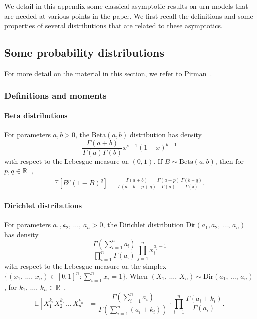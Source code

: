 \documentclass[10pt]{amsart}
\theoremstyle{definition}\newtheorem{defi}[theo]{Definition}\newtheorem{rema}[theo]{Remark}\newtheorem{exam}[theo]{Example}\newtheorem{exem}[theo]{Example}\newtheorem{nota}[theo]{Notation}
\newcommand{\Ec}[1]{\mathbb{E} \left[#1\right]}
\newcommand{\Betal}{\mathrm{Beta}}
\newcommand{\Dir}{\mathrm{Dir}}
\newcommand{\R}{\mathbb{R}}
\begin{document}
We detail in this appendix some classical asymptotic results on urn models that are needed at various points in the paper. We first recall the definitions and some properties of several distributions that are related to these asymptotics.

\subsection{Some probability distributions}

For more detail on the material in this section, we refer to Pitman~\cite{PitmanStFl}.

\subsubsection{Definitions and moments}

\paragraph{Beta distributions}
For parameters $a,b >0$, the $\Betal(a,b)$ distribution has density
\[
\frac{\Gamma(a+b)}{\Gamma(a) \Gamma(b)} x^{a-1} (1-x)^{b-1}
\]
with respect to the Lebesgue measure on $(0,1)$. If $B \sim \Betal(a,b)$, then for $p,q \in \R_+,$
\begin{align}\label{eq:moments beta}
\Ec{B^p(1-B)^q}=\frac{\Gamma(a+b)}{\Gamma(a+b+p+q)}\frac{\Gamma(a+p)}{\Gamma(a)}\frac{\Gamma(b+q)}{\Gamma(b)}.
\end{align}



\paragraph{Dirichlet distributions}
For parameters $a_1, a_2,\,\ldots,\,a_n > 0$, the Dirichlet distribution $\Dir(a_1, a_2,\,\ldots,\,a_n)$ has density
\[
\frac{\Gamma\left(\sum\limits_{i=1}^n a_i\right)}{\prod\limits_{i=1}^n \Gamma(a_i)} \prod_{j=1}^{n} x_i^{a_j-1}
\]
with respect to the Lebesgue measure on the simplex $\{(x_1,\,\ldots,\,x_n) \in [0,1]^n: \sum_{i=1}^n x_i = 1\}$. When $(X_1,\,\dots,\, X_n)\sim \Dir(a_1,\,\dots,\,a_n)$, for $k_1,\,\ldots,\,k_n \in \R_+$,
\begin{equation}\label{moments dirichlet}
\Ec{X_1^{k_1}X_2^{k_2}\,\dots\,X_n^{k_n}}= \frac{\Gamma\left(\sum\limits_{i=1}^na_i\right)}{\Gamma\left(\sum\limits_{i=1}^n\left(a_i+k_i\right)\right)}\cdot \prod\limits_{i=1}^n\frac{\Gamma\left(a_i+k_i\right)}{\Gamma(a_i)}.
\end{equation}
\end{document}
